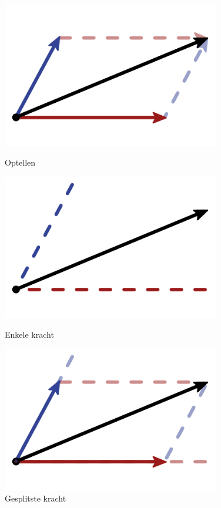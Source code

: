 \begin{figure}[H]
	\centering
	\begin{minipage}[b]{0.32\textwidth}
		\centering
		\includegraphics[width=0.85\textwidth]{Hoofdstukken/Krachten/pdf/kracht_optellen.pdf}
		\caption{Optellen}
		\label{pic:kracht_som}
	\end{minipage}
	\hfill
	\begin{minipage}[b]{0.32\textwidth}
		\centering
		\includegraphics[width=0.85\textwidth]{Hoofdstukken/Krachten/pdf/kracht_richtingen.pdf}
		\caption{Enkele kracht}
		\label{pic:kracht_splits}
	\end{minipage}
	\hfill
	\begin{minipage}[b]{0.32\textwidth}
		\centering
		\includegraphics[width=0.85\textwidth]{Hoofdstukken/Krachten/pdf/kracht_splitsen.pdf}
		\caption{Gesplitste kracht}
		\label{pic:kracht_splits2}
	\end{minipage}
\end{figure}


